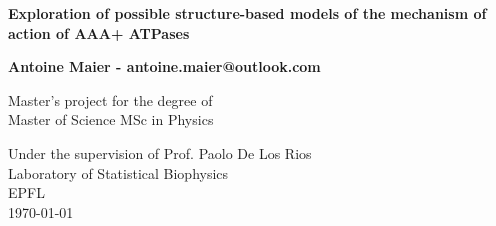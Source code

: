 \begin{titlepage}
    \begin{center}
        \vspace*{1cm}
            
        \Huge
        \textbf{Exploration of possible structure-based models of the mechanism of action of AAA+ ATPases}
            
        \vspace{0.5cm}
        \LARGE
            
        \vspace{1.5cm}
            
        \textbf{Antoine Maier - antoine.maier@outlook.com}
            
        \vfill
            
        Master's project for the degree of\\
        Master of Science MSc in Physics
            
        \vspace{0.8cm}
        \Large
        
        Under the supervision of Prof. Paolo De Los Rios\\
        Laboratory of Statistical Biophysics\\
        EPFL\\
        \today
            
    \end{center}
\end{titlepage}